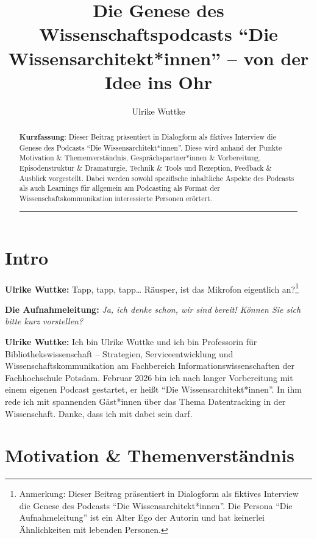 \documentclass[a4paper,
fontsize=11pt,
oneside,
numbers=noperiodatend,
parskip=half-,
bibliography=totoc,
final
]{scrartcl}
\title{\LARGE{Die Genese des Wissenschaftspodcasts \enquote{Die Wissensarchitekt*innen} – von der Idee ins Ohr}}%
\author{Ulrike Wuttke} %
\date{}
\begin{document}
\maketitle
\thispagestyle{fancyplain} 

\begin{abstract}
\noindent
\textbf{Kurzfassung}: Dieser Beitrag präsentiert in Dialogform als
fiktives Interview die Genese des Podcasts \enquote{Die
Wissensarchitekt*innen}. Diese wird anhand der Punkte Motivation
\& Themenverständnis, Gesprächspartner*innen \& Vorbereitung,
Episodenstruktur \& Dramaturgie, Technik \& Tools und Rezeption,
Feedback \& Ausblick vorgestellt. Dabei werden sowohl spezifische
inhaltliche Aspekte des Podcasts als auch Learnings für allgemein am
Podcasting als Format der Wissenschaftskommunikation interessierte
Personen erörtert.

\begin{center}\rule{0.5\linewidth}{0.5pt}\end{center}
\end{abstract}

\section{Intro}\label{intro}

\textbf{Ulrike Wuttke:} Tapp, tapp, tapp\ldots{} Räusper, ist das
Mikrofon eigentlich an?\footnote{Anmerkung: Dieser Beitrag präsentiert
  in Dialogform als fiktives Interview die Genese des Podcasts
  \enquote{Die Wissensarchitekt*innen}. Die Persona \enquote{Die
  Aufnahmeleitung} ist ein Alter Ego der Autorin und hat keinerlei
  Ähnlichkeiten mit lebenden Personen.}

\textbf{Die Aufnahmeleitung:} \emph{Ja, ich denke schon, wir sind
bereit! Können Sie sich bitte kurz vorstellen?}

\textbf{Ulrike Wuttke:} Ich bin Ulrike Wuttke und ich bin Professorin
für Bibliothekswissenschaft -- Strategien, Serviceentwicklung und
Wissenschaftskommunikation am Fachbereich Informationswissenschaften der
Fachhochschule Potsdam. Februar 2026 bin ich nach langer Vorbereitung
mit einem eigenen Podcast gestartet, er heißt \enquote{Die
Wissensarchitekt*innen}. In ihm rede ich mit spannenden Gäst*innen über
das Thema Datentracking in der Wissenschaft. Danke, dass ich mit dabei
sein darf.

\section{Motivation \&
Themenverständnis}\label{motivation-themenverstuxe4ndnis}
\end{document}
